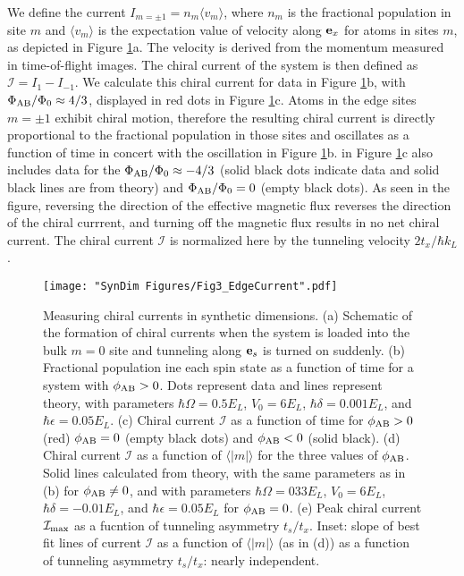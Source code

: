 We  define the current $I_{m=\pm1}=n_m \langle v_m \rangle$, where $n_m$ is the fractional population in site $m$ and $\langle v_m \rangle$ is the expectation value of velocity along ${\bf e}_x$ for atoms in sites $m$, as depicted in Figure \ref{fig:edgeCurrents}a. The velocity is derived from the momentum measured in time-of-flight images. The chiral current of the system is then defined as $\mathcal{I}=I_1-I_{-1}$. We calculate this chiral current for data in  Figure \ref{fig:edgeCurrents}b, with $\Phi_{\rm AB}/\Phi_0\approx4/3$, displayed in red dots in Figure \ref{fig:edgeCurrents}c. Atoms in the edge sites $m=\pm1$ exhibit chiral motion, therefore the resulting chiral current is directly proportional to the fractional population in those sites and oscillates as a function of time in concert with the oscillation in Figure \ref{fig:edgeCurrents}b. in Figure \ref{fig:edgeCurrents}c also includes data for the $\Phi_{\rm AB}/\Phi_0\approx-4/3$ (solid black dots indicate data and solid black lines are from theory) and $\Phi_{\rm AB}/\Phi_0=0$ (empty black dots). As seen in the figure, reversing the direction of the effective magnetic flux reverses the direction of the chiral currrent, and turning off the magnetic flux results in no net chiral current. The chiral current $\mathcal{I}$ is normalized here by the tunneling velocity $2 t_x/\hbar k_L$. 

\begin{figure}
	\texttt{[image: "SynDim Figures/Fig3\_EdgeCurrent".pdf]}
\caption{Measuring chiral currents in synthetic dimensions. (a) Schematic of the formation of chiral currents when the system is loaded into the bulk $m=0$ site and tunneling along ${\bf e}_s$ is turned on suddenly. (b) Fractional population ine each spin state as a function of time for a system with $\phi_{\rm AB}>0$. Dots represent data and lines represent theory, with parameters $\hbar\Omega=0.5 E_L$, $V_0=6 E_L$, $\hbar\delta=0.001 E_L$, and $\hbar\epsilon=0.05 E_L$. (c) Chiral current $\mathcal{I}$ as a function of time for $\phi_{\rm AB}>0$ (red) $\phi_{\rm AB}=0$ (empty black dots) and $\phi_{\rm AB}<0$ (solid black). (d) Chiral current $\mathcal{I}$ as a function of $\langle|m|\rangle$ for the three values of $\phi_{\rm AB}$. Solid lines calculated from theory, with the same parameters as in (b) for $\phi_{\rm AB}\neq0$, and with parameters $\hbar\Omega=033 E_L$, $V_0=6 E_L$, $\hbar\delta=-0.01 E_L$, and $\hbar\epsilon=0.05 E_L$ for $\phi_{\rm AB}=0$.  (e) Peak chiral current $\mathcal{I}_{\rm max}$ as a fucntion of tunneling asymmetry $t_s/t_x$. Inset: slope of best fit lines of current $\mathcal{I}$ as a function of $\langle|m|\rangle$ (as in (d)) as a function of tunneling asymmetry $t_s/t_x$: nearly independent. }
\label{fig:edgeCurrents}
\end{figure}

